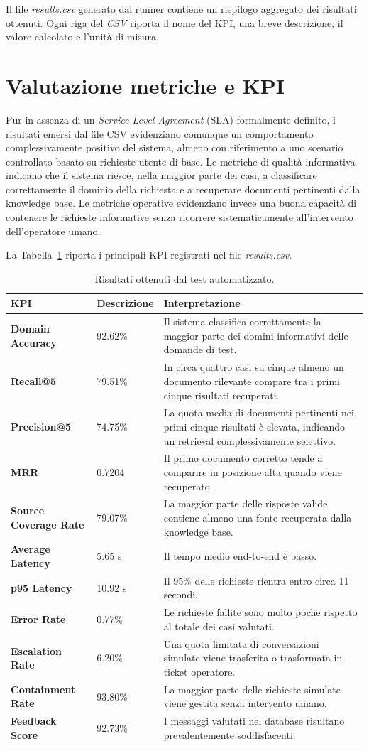 Il file \textit{results.csv} generato dal runner contiene un riepilogo aggregato dei risultati ottenuti. Ogni riga del \textit{CSV} riporta il nome del KPI, una breve descrizione, il valore calcolato e l’unità di misura.

\section{Valutazione metriche e KPI}

Pur in assenza di un \textit{Service Level Agreement} (SLA) formalmente definito, i risultati emersi dal file CSV evidenziano comunque un comportamento complessivamente positivo del sistema, almeno con riferimento a uno scenario controllato basato su richieste utente di base. Le metriche di qualità informativa indicano che il sistema riesce, nella maggior parte dei casi, a classificare correttamente il dominio della richiesta e a recuperare documenti pertinenti dalla knowledge base. Le metriche operative evidenziano invece una buona capacità di contenere le richieste informative senza ricorrere sistematicamente all’intervento dell’operatore umano.

La Tabella~\ref{tab:kpi-results} riporta i principali KPI registrati nel file \textit{results.csv}.

\begingroup
\small
\begin{longtable}{p{}p{}p{}}
\caption{Risultati ottenuti dal test automatizzato.}
\label{tab:kpi-results}\tabularnewline
\toprule
\textbf{KPI} & \textbf{Descrizione} & \textbf{Interpretazione}\tabularnewline
\midrule
\textbf{Domain Accuracy} & 92.62\% & Il sistema classifica correttamente la maggior parte dei domini informativi delle domande di test.\tabularnewline
\textbf{Recall@5} & 79.51\% & In circa quattro casi su cinque almeno un documento rilevante compare tra i primi cinque risultati recuperati.\tabularnewline
\textbf{Precision@5} & 74.75\% & La quota media di documenti pertinenti nei primi cinque risultati è elevata, indicando un retrieval complessivamente selettivo.\tabularnewline
\textbf{MRR} & 0.7204 & Il primo documento corretto tende a comparire in posizione alta quando viene recuperato.\tabularnewline
\textbf{Source Coverage Rate} & 79.07\% & La maggior parte delle risposte valide contiene almeno una fonte recuperata dalla knowledge base.\tabularnewline
\textbf{Average Latency} & 5.65 s & Il tempo medio end-to-end è basso.\tabularnewline
\textbf{p95 Latency} & 10.92 s & Il 95\% delle richieste rientra entro circa 11 secondi.\tabularnewline
\textbf{Error Rate} & 0.77\% & Le richieste fallite sono molto poche rispetto al totale dei casi valutati.\tabularnewline
\textbf{Escalation Rate} & 6.20\% & Una quota limitata di conversazioni simulate viene trasferita o trasformata in ticket operatore.\tabularnewline
\textbf{Containment Rate} & 93.80\% & La maggior parte delle richieste simulate viene gestita senza intervento umano.\tabularnewline
\textbf{Feedback Score} & 92.73\% & I messaggi valutati nel database risultano prevalentemente soddisfacenti.\tabularnewline
\bottomrule
\end{longtable}
\endgroup

